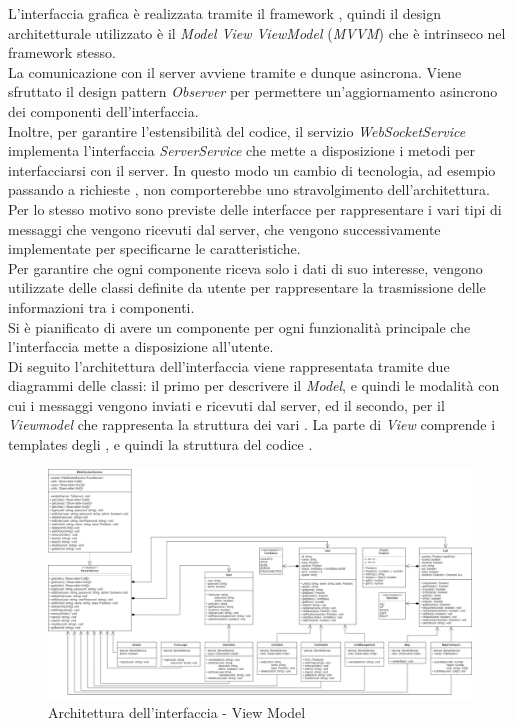 L'interfaccia grafica è realizzata tramite il framework , quindi il design architetturale utilizzato è il \textit{Model View ViewModel} (\textit{MVVM}) che è intrinseco nel framework stesso. \\
La comunicazione con il server avviene tramite  e dunque asincrona. Viene sfruttato il design pattern \textit{Observer} per permettere un'aggiornamento asincrono dei componenti dell'interfaccia.\\
Inoltre, per garantire l'estensibilità del codice, il servizio \textit{WebSocketService} implementa l'interfaccia \textit{ServerService} che mette a disposizione i metodi per interfacciarsi con il server. In questo modo un cambio di tecnologia, ad esempio passando a richieste , non comporterebbe uno stravolgimento dell'architettura. \\
Per lo stesso motivo sono previste delle interfacce per rappresentare i vari tipi di messaggi che vengono ricevuti dal server, che vengono successivamente implementate per specificarne le caratteristiche. \\
Per garantire che ogni componente riceva solo i dati di suo interesse, vengono utilizzate delle classi definite da utente per rappresentare la trasmissione delle informazioni tra i componenti. \\
Si è pianificato di avere un componente per ogni funzionalità principale che l'interfaccia mette a disposizione all'utente. \\
\newline
Di seguito l'architettura dell'interfaccia viene rappresentata tramite due diagrammi delle classi: il primo per descrivere il \textit{Model}, e quindi le modalità con cui i messaggi vengono inviati e ricevuti dal server, ed il secondo, per il \textit{Viewmodel} che rappresenta la struttura dei vari . La parte di \textit{View} comprende i templates degli , e quindi la struttura del codice . \\


\newpage

\begin{landscape}
	\begin{figure}[h!]
		\includegraphics[width=25.5cm]{img/ui_component.png}
		\caption{Architettura dell'interfaccia - View Model}
	\end{figure}
\end{landscape}
\newpage

